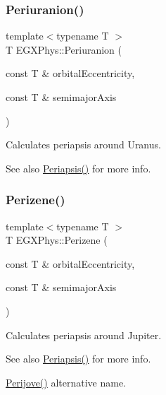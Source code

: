 \subsubsection{\texorpdfstring{Periuranion()}{Periuranion()}}
{\footnotesize\ttfamily template$<$typename T $>$ \\
T E\+G\+X\+Phys\+::\+Periuranion (\begin{DoxyParamCaption}\item[{const T \&}]{orbital\+Eccentricity,  }\item[{const T \&}]{semimajor\+Axis }\end{DoxyParamCaption})}



Calculates periapsis around Uranus. 

\begin{DoxySeeAlso}{See also}
\hyperlink{group___e_g_x_phys-_periapsis_ga4414ac75539371ec874a3d25cad6c9fe}{Periapsis()} for more info. 
\end{DoxySeeAlso}
\mbox{\label{group___e_g_x_phys-_periapsis_ga0523c65b7fc26e675388b2c3d38aa00b}} 
\subsubsection{\texorpdfstring{Perizene()}{Perizene()}}
{\footnotesize\ttfamily template$<$typename T $>$ \\
T E\+G\+X\+Phys\+::\+Perizene (\begin{DoxyParamCaption}\item[{const T \&}]{orbital\+Eccentricity,  }\item[{const T \&}]{semimajor\+Axis }\end{DoxyParamCaption})}



Calculates periapsis around Jupiter. 

\begin{DoxySeeAlso}{See also}
\hyperlink{group___e_g_x_phys-_periapsis_ga4414ac75539371ec874a3d25cad6c9fe}{Periapsis()} for more info. 

\hyperlink{group___e_g_x_phys-_periapsis_ga075052f7ff9aa1d5fdf4501b493be86b}{Perijove()} alternative name. 
\end{DoxySeeAlso}
